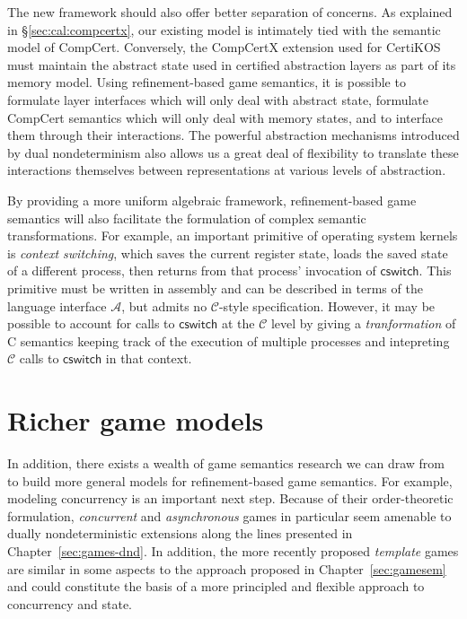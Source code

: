 \documentclass[11pt,oneside,draft]{book}
\theoremstyle{definition}
\newcommand{\kw}[1]{\ensuremath{ \mathsf{#1} }}
\begin{document}
The new framework should also offer
better separation of concerns.
As explained in \S\ref{sec:cal:compcertx},
our existing model
is intimately tied with the semantic model of CompCert.
Conversely,
the CompCertX extension used for CertiKOS
must maintain the abstract state used in certified abstraction layers
as part of its memory model.
Using refinement-based game semantics,
it is possible to formulate layer interfaces
which will only deal with abstract state,
formulate CompCert semantics which will only deal
with memory states,
and to interface them through their interactions.
The powerful abstraction mechanisms
introduced by dual nondeterminism
also allows us a great deal of flexibility
to translate these interactions themselves
between representations at various levels of abstraction.

By providing a more uniform algebraic framework,
refinement-based game semantics will also facilitate
the formulation of complex semantic transformations.
For example,
an important primitive of operating system kernels
is \emph{context switching},
which saves the current register state,
loads the saved state of a different process,
then returns from that process' invocation of \kw{cswitch}.
This primitive must be written in assembly
and can be described in terms of the language interface $\mathcal{A}$,
but admits no $\mathcal{C}$-style specification.
However,
it may be possible to account for calls to \kw{cswitch}
at the $\mathcal{C}$ level
by giving a \emph{tranformation} of C semantics
keeping track of the execution of multiple processes
and intepreting $\mathcal{C}$ calls to \kw{cswitch}
in that context.


\section{Richer game models} %

In addition,
there exists a wealth of game semantics research
we can draw from to build
more general models for refinement-based game semantics.
For example,
modeling concurrency is an important next step.
Because of their order-theoretic formulation,
\emph{concurrent} and \emph{asynchronous} games \citep{cgames,agames2}
in particular seem amenable to dually nondeterministic extensions
along the lines presented in Chapter~\ref{sec:games-dnd}.
In addition,
the more recently proposed
\emph{template} games \citep{tgames}
are similar in some aspects
to the approach proposed in Chapter~\ref{sec:gamesem}
and could constitute the basis of
a more principled and flexible approach
to concurrency and state.
\end{document}

